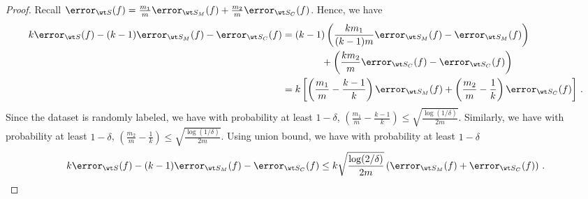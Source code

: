 \begin{proof}
    Recall $\error_{\wt S} (f) = \frac{m_1}{m} \error_{\wt S_M}(f) + \frac{m_2}{m} \error_{\wt S_C}(f)$. Hence, we have 
    \begin{align*}
        k\error_{\wt S}(f) - (k-1)\error_{\wt S_M}(f) - \error_{\wt S_C}(f) &= (k-1)\left(\frac{k m_1}{(k-1) m} \error_{\wt S_M}(f) - \error_{\wt S_M}(f)\right) \\ & \qquad \qquad + \left(\frac{km_2}{m} \error_{\wt S_C}(f) - \error_{\wt S_C}(f)\right) \\ &= k \left[ \left(\frac{m_1}{m} - \frac{k-1}{k}\right) \error_{\wt S_M}(f) + \left(\frac{m_2}{m} - \frac{1}{k} \right) \error_{\wt S_C} (f) \right] \,.
    \end{align*} 
    Since the dataset is randomly labeled, 
    we have with probability at least $1-\delta$, 
    $\left(\frac{m_1}{m} - \frac{k-1}{k}\right) \le \sqrt{\frac{\log(1/\delta)}{2m}}$. 
    Similarly, we have with probability at least $1-\delta$, 
    $\left(\frac{m_2}{m} - \frac{1}{k}\right) \le \sqrt{\frac{\log(1/\delta)}{2m}}$. 
    Using union bound, we have with probability at least $1-\delta$
    \begin{align}
        k\error_{\wt S}(f) - (k-1)\error_{\wt S_M}(f) - \error_{\wt S_C}(f)  \le k \sqrt{\frac{\log(2/\delta)}{2m}} \left(\error_{\wt S_M}(f) + \error_{\wt S_C}(f) \right) \,. \label{eq:lemma2_final_multi}
    \end{align}

\end{proof}

